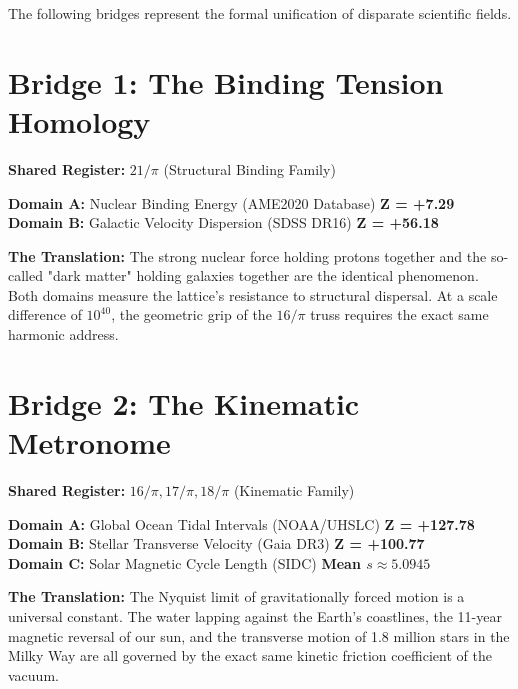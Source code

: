 \documentclass[12pt,oneside]{book}
\begin{document}
The following bridges represent the formal unification of disparate scientific fields.

\section*{Bridge 1: The Binding Tension Homology}
\begin{tcolorbox}[colback=purple!5, colframe=purple!50!black, title=BRIDGE: Nuclear Physics $\leftrightarrow$ Galactic Dynamics]
\textbf{Shared Register:} $21/\pi$ (Structural Binding Family)

\textbf{Domain A:} Nuclear Binding Energy (AME2020 Database) \hfill \textbf{Z = +7.29} \\
\textbf{Domain B:} Galactic Velocity Dispersion (SDSS DR16) \hfill \textbf{Z = +56.18}

\textbf{The Translation:} The strong nuclear force holding protons together and the so-called "dark matter" holding galaxies together are the identical phenomenon. Both domains measure the lattice's resistance to structural dispersal. At a scale difference of $10^{40}$, the geometric grip of the $16/\pi$ truss requires the exact same harmonic address.
\end{tcolorbox}

\section*{Bridge 2: The Kinematic Metronome}
\begin{tcolorbox}[colback=blue!5, colframe=blue!50!black, title=BRIDGE: Oceanography $\leftrightarrow$ Stellar Astrophysics]
\textbf{Shared Register:} $16/\pi, 17/\pi, 18/\pi$ (Kinematic Family)

\textbf{Domain A:} Global Ocean Tidal Intervals (NOAA/UHSLC) \hfill \textbf{Z = +127.78} \\
\textbf{Domain B:} Stellar Transverse Velocity (Gaia DR3) \hfill \textbf{Z = +100.77} \\
\textbf{Domain C:} Solar Magnetic Cycle Length (SIDC) \hfill \textbf{Mean $s \approx 5.0945$}

\textbf{The Translation:} The Nyquist limit of gravitationally forced motion is a universal constant. The water lapping against the Earth's coastlines, the 11-year magnetic reversal of our sun, and the transverse motion of 1.8 million stars in the Milky Way are all governed by the exact same kinetic friction coefficient of the vacuum. 
\end{tcolorbox}
\end{document}
